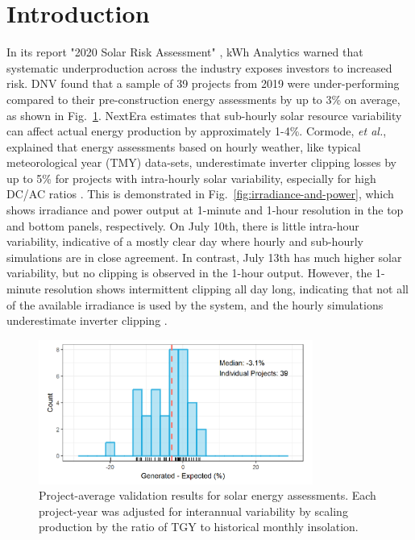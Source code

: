 \documentclass[conference]{IEEEtran}
\begin{document}
\section{Introduction}
In its report "2020 Solar Risk Assessment" \cite{Matsui2020}, kWh Analytics warned that systematic underproduction across the industry exposes investors to increased risk. DNV found that a sample of 39 projects from 2019 were under-performing compared to their pre-construction energy assessments by up to 3\% on average, as shown in Fig.~\ref{fig:project-underperformance}. NextEra estimates that sub-hourly solar resource variability can affect actual energy production by approximately 1-4\%. Cormode, \textit{et al.}, explained that energy assessments based on hourly weather, like typical meteorological year (TMY) data-sets, underestimate inverter clipping losses by up to 5\% for projects with intra-hourly solar variability, especially for high DC/AC ratios \cite{Cormode2019}. This is demonstrated in Fig.~\ref{fig:irradiance-and-power}, which shows irradiance and power output at 1-minute and 1-hour resolution in the top and bottom panels, respectively. On July 10th, there is little intra-hour variability, indicative of a mostly clear day where hourly and sub-hourly simulations are in close agreement. In contrast, July 13th has much higher solar variability, but no clipping is observed in the 1-hour output. However, the 1-minute resolution shows intermittent clipping all day long, indicating that not all of the available irradiance is used by the system, and the hourly simulations underestimate inverter clipping \cite{Kharait}.


\begin{figure}[htbp]
\centerline{\includegraphics[width=9cm]{fig1.png}}
\caption{Project-average validation results for solar energy assessments. Each project-year was adjusted for interannual variability by scaling production by the ratio of TGY to historical monthly insolation.}
\label{fig:project-underperformance}
\end{figure}
\end{document}
